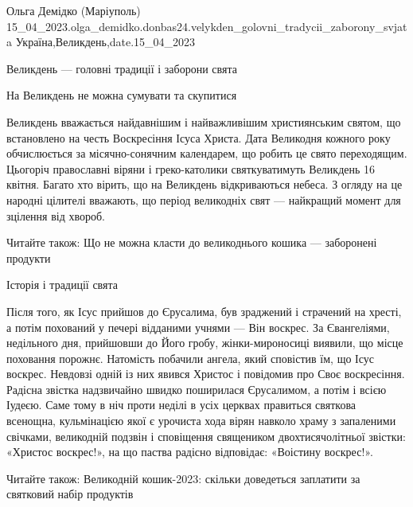  
 
 
 
 

Ольга Демідко (Маріуполь)
15_04_2023.olga_demidko.donbas24.velykden_golovni_tradycii_zaborony_svjata
Україна,Великдень,date.15_04_2023

Великдень — головні традиції і заборони свята

На Великдень не можна сумувати та скупитися

Великдень вважається найдавнішим і найважливішим християнським святом, що
встановлено на честь Воскресіння Ісуса Христа. Дата Великодня кожного року
обчислюється за місячно-сонячним календарем, що робить це свято переходящим.
Цьогоріч православні віряни і греко-католики святкуватимуть Великдень 16
квітня. Багато хто вірить, що на Великдень відкриваються небеса. З огляду на це
народні цілителі вважають, що період великодніх свят — найкращий момент для
зцілення від хвороб.

Читайте також: Що не можна класти до великоднього кошика — заборонені продукти

Історія і традиції свята

Після того, як Ісус прийшов до Єрусалима, був зраджений і страчений на хресті,
а потім похований у печері відданими учнями — Він воскрес. За Євангеліями,
недільного дня, прийшовши до Його гробу, жінки-мироносиці виявили, що місце
поховання порожнє. Натомість побачили ангела, який сповістив їм, що Ісус
воскрес. Невдовзі одній із них явився Христос і повідомив про Своє воскресіння.
Радісна звістка надзвичайно швидко поширилася Єрусалимом, а потім і всією
Іудеєю. Саме тому в ніч проти неділі в усіх церквах правиться святкова
всенощна, кульмінацією якої є урочиста хода вірян навколо храму з запаленими
свічками, великодній подзвін і сповіщення священиком двохтисячолітньої звістки:
«Христос воскрес!», на що паства радісно відповідає: «Воістину воскрес!».

Читайте також: Великодній кошик-2023: скільки доведеться заплатити за святковий
набір продуктів

